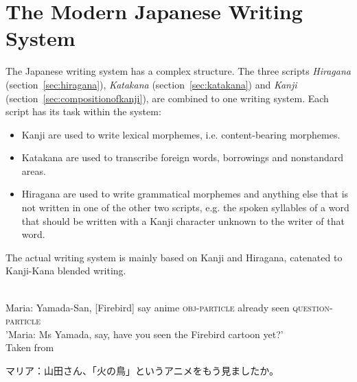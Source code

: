 \section{The Modern Japanese Writing System}
\label{sec:modernjapanesewritingsystem}


The Japanese writing system has a complex structure. The three scripts 
\emph{Hiragana} (section~\ref{sec:hiragana}),
\emph{Katakana} (section~\ref{sec:katakana}) and
\emph{Kanji} (section~\ref{sec:compositionofkanji}),
are combined to one writing system. Each script has its task within the system:
\begin{itemize}

  \item Kanji are used to write lexical morphemes, i.e. content-bearing morphemes.

  \item Katakana are used to transcribe foreign words, borrowings and 
        nonstandard areas.

  \item Hiragana are used to write grammatical morphemes and anything else that
        is not written in one of the other two scripts, e.g. the spoken syllables
        of a word that should be written with a Kanji character unknown to the 
        writer of that word.
\end{itemize}
The actual writing system is mainly based on Kanji and Hiragana, catenated to
Kanji-Kana blended writing.
\begin{exe}
\ex\label{exe:mariaYamada}
\begin{xlist}
\ex \label{exe:mariaYamadaSplit}
\gll 
  \\
 Maria: Yamada-San, [Firebird] say anime \textsc{obj-particle} already seen \textsc{question-particle} \\
\trans 'Maria: Ms Yamada, say, have you seen the Firebird cartoon yet?' \\
Taken from~
\ex\label{exe:mariaYamadaFull}
 \begin{CJK} 
  マリア：山田さん、「火の鳥」というアニメをもう見ましたか。
 \end{CJK}
\end{xlist}
\end{exe}
